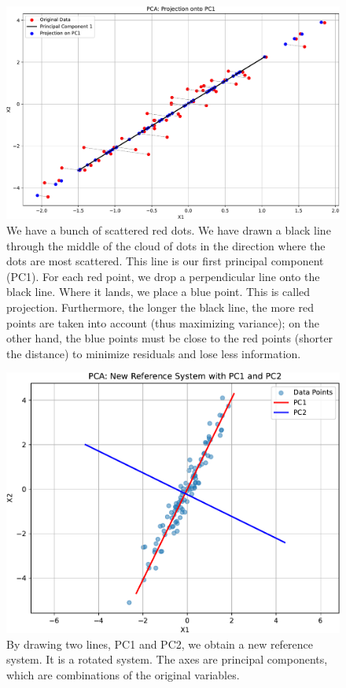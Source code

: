 \begin{figure}[!htp]
    \centering
    \includegraphics[width=\textwidth]{img/pca.pdf}
    \caption{We have a bunch of scattered red dots. We have drawn a black line through the middle of the cloud of dots in the direction where the dots are most scattered. This line is our first principal component (PC1). For each red point, we drop a perpendicular line onto the black line. Where it lands, we place a blue point. This is called projection. Furthermore, the longer the black line, the more red points are taken into account (thus maximizing variance); on the other hand, the blue points must be close to the red points (shorter the distance) to minimize residuals and lose less information.}
\end{figure}

\newpage

\begin{figure}[!htp]
    \centering
    \includegraphics[width=\textwidth]{img/pca-2.pdf}
    \caption{By drawing two lines, PC1 and PC2, we obtain a new reference system. It is a rotated system. The axes are principal components, which are combinations of the original variables.}
\end{figure}

